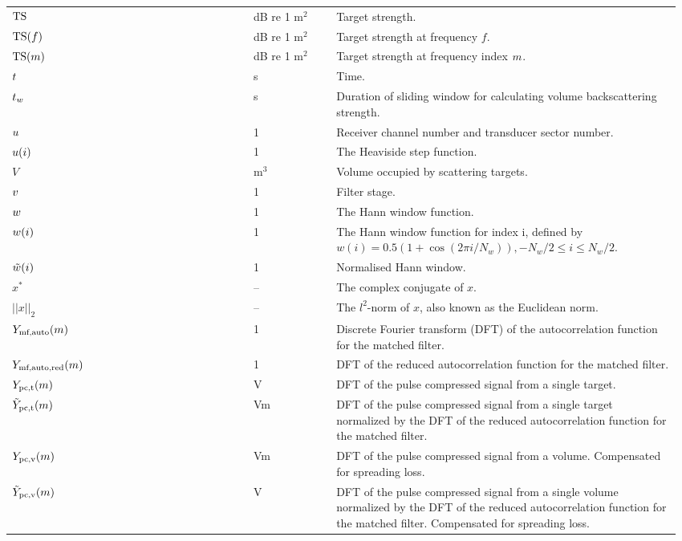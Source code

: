 \documentclass[12pt,a4paper]{article}
\renewcommand{\code}[1]{\texttt{\detokenize{#1}}}
\begin{document}
\begin{longtable}{p{0.15\linewidth} p{0.20\linewidth} p{0.12\linewidth} p{0.5\linewidth} }
$\textrm{TS}$ & & dB re 1 $\textrm{m}^2$ & Target strength.\\
$\textrm{TS}(f)$ & & dB re 1 $\textrm{m}^2$ & Target strength at frequency $f$.\\
$\textrm{TS}(m)$ & \code{TS_m} & dB re 1 $\textrm{m}^{2}$ & Target strength at frequency index $m$.\\

$t$ & & s &  Time.\\
$t_w$ & & s & Duration of sliding window for calculating volume backscattering strength.\\

$u$ & & 1 & Receiver channel number and transducer sector number.\\
$u(i)$ & & 1 & The Heaviside step function. \\
$V$ & & $\textrm{m}^3$ & Volume occupied by scattering targets.\\
$v$ & & 1 & Filter stage.\\

$w$ & & 1 & The Hann window function.\\
$w(i)$ & & 1 & The Hann window function for index i, defined by $w(i) = 0.5(1+\cos (2\pi i /N_w)), -N_w/2 \leq i \leq N_w/2$.\\
$\tilde{w}(i)$ & & 1 & Normalised Hann window.\\

$x^*$ & & -- & The complex conjugate of $x$.\\
$||x||_2$ & & -- & The $l^2$-norm of $x$, also known as the Euclidean norm.\\

$Y_{\textrm{mf,auto}}(m)$ & & 1 & Discrete Fourier transform (DFT) of the autocorrelation function for the matched filter.\\
$Y_{\textrm{mf,auto,red}}(m)$ &  & 1 & DFT of the reduced autocorrelation function for the matched filter.\\
$Y_{\textrm{pc,t}}(m)$ & & V & DFT of the pulse compressed signal from a single target.\\
$\tilde{Y}_{\textrm{pc,t}}(m)$ & & Vm & DFT of the pulse compressed signal from a single target 
normalized by the DFT of the reduced autocorrelation function for the matched filter.\\
$Y_{\textrm{pc,v}}(m)$ & & Vm & DFT of the pulse compressed signal from a volume. Compensated for spreading loss.\\
$\tilde{Y}_{\textrm{pc,v}}(m)$ & & V & DFT of the pulse compressed signal from a single volume normalized by the DFT of the reduced autocorrelation function for the matched filter.  Compensated for spreading loss.\\


\end{longtable}
\end{document}
